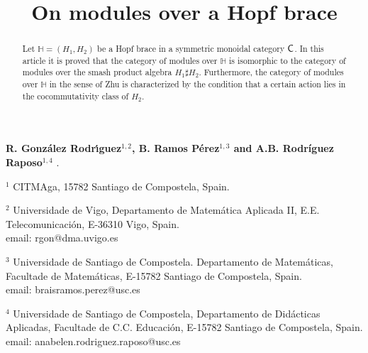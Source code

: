 \documentclass[11pt,reqno]{amsart}
\title[On modules over a Hopf brace]{On modules over a Hopf brace}
\theoremstyle{plain}%
\theoremstyle{definition}
\theoremstyle{remark}
\begin{document}
	
	
\maketitle

\begin{center}
	{\bf R.
		Gonz\'{a}lez Rodr\'{\i}guez$^{1,2}$, B.  Ramos P\'erez$^{1,3}$ and A.B. Rodríguez Raposo$^{1,4}$ }.
\end{center}

\vspace{0.4cm}

\begin{center}	{\small $^{1}$ CITMAga, 15782 Santiago de Compostela, Spain.}
\end{center}
\vspace{0.2cm}
\begin{center}
	{\small $^{2}$ Universidade de Vigo, Departamento de Matem\'{a}tica Aplicada II, E.E. Telecomunicaci\'on,
		E-36310 Vigo, Spain.
		\\email: rgon@dma.uvigo.es}
\end{center}
\vspace{0.2cm}
\begin{center}
	{\small $^{3}$  Universidade de Santiago de Compostela. Departamento de Matem\'aticas,  Facultade de Matem\'aticas, E-15782 Santiago de Compostela, Spain. 
		\\email: braisramos.perez@usc.es}
\end{center}
\vspace{0.2cm}
\begin{center}
	{\small $^{4}$  Universidade de Santiago de Compostela, Departamento de Didácticas Aplicadas,  Facultade de C.C. Educación, E-15782 Santiago de Compostela, Spain.
		\\email: anabelen.rodriguez.raposo@usc.es}
\end{center}
\vspace{0.2cm}

\begin{abstract}
     Let $\mathbb{H}=(H_{1},H_{2})$ be a Hopf brace in a symmetric monoidal category ${\sf C}$. In this article it is proved that the category of modules over $\mathbb{H}$ is isomorphic to the category of modules over the smash product algebra $H_{1}\sharp H_{2}$. Furthermore, the category of modules over $\mathbb{H}$ in the sense of Zhu is characterized by the condition that a certain action lies in the cocommutativity class of $H_{2}$.    
 \end{abstract}
 
\end{document}
